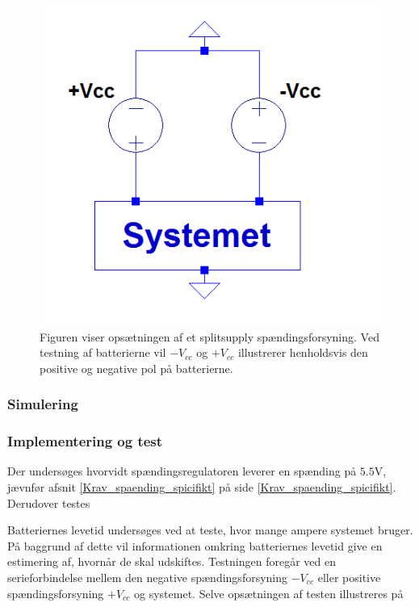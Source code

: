 \begin{figure}[H]
\centering
\includegraphics[scale=0.5]{figures/cProblemloesning/Splitsupply.PNG}
\caption{Figuren viser opsætningen af et splitsupply spændingsforsyning. Ved testning af batterierne vil $-V_{cc}$ og $+V_{cc}$ illustrerer henholdsvis den positive og negative pol på batterierne.}
\label{fig:splitsupply}
\end{figure}
\subsubsection{Simulering}

\subsubsection{Implementering og test}
Der undersøges hvorvidt spændingsregulatoren leverer en spænding på $5.5$V, jævnfør afsnit \ref{Krav_spaending_spicifikt} på side \ref{Krav_spaending_spicifikt}. Derudover testes %

Batteriernes levetid undersøges ved at teste, hvor mange ampere systemet bruger. På baggrund af dette vil informationen omkring batteriernes levetid give en estimering af, hvornår de skal udskiftes. Testningen foregår ved en serieforbindelse mellem den negative spændingsforsyning $-V_{cc}$ eller positive spændingsforsyning $+V_{cc}$ og systemet. Selve opsætningen af testen illustreres på %

